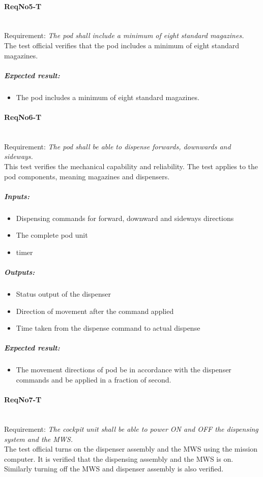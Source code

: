 \paragraph{ReqNo5-T}\mbox{}\\ %
Requirement: \textit{The pod shall include a minimum of eight standard magazines.}\\

The test official verifies that the pod includes a minimum of eight standard magazines.

\subparagraph{Expected result:}
	\begin{itemize}
	\item The pod includes a minimum of eight standard magazines.
	\end{itemize}

\paragraph{ReqNo6-T}\mbox{}\\ %
Requirement: \textit{The pod shall be able to dispense forwards, downwards and sideways.}\\
This test verifies the mechanical capability and reliability. The test applies to the pod components, meaning magazines and dispensers.
	\subparagraph{Inputs:}
	\begin{itemize}
	\item Dispensing commands for forward, downward and sideways directions
	\item The complete pod unit
	\item timer
	\end{itemize}
	\subparagraph{Outputs:}
	\begin{itemize}
	\item Status output of the dispenser
	\item Direction of movement after the command applied
	\item Time taken from the dispense command to actual dispense
	\end{itemize}
	\subparagraph{Expected result:}
	\begin{itemize}
	\item The movement directions of pod be in accordance with the dispenser commands and be applied in a fraction of second.
	\end{itemize}
\paragraph{ReqNo7-T}\mbox{}\\ %
Requirement: \textit{The cockpit unit shall be able to power ON and OFF the dispensing system and the MWS.}
\\
The test official turns on the dispenser assembly and the MWS using the mission computer. It is verified that the dispensing assembly and the MWS is on. Similarly turning off the MWS and dispenser assembly is also verified.

